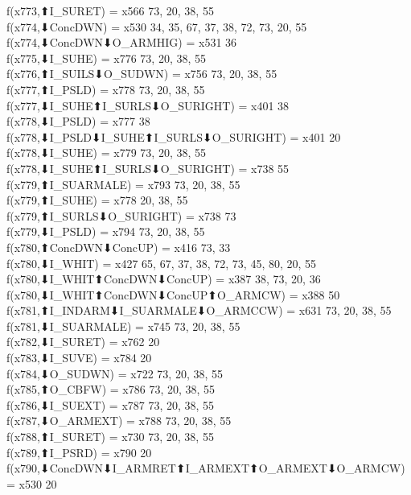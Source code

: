 f(x773,⬆I_SURET) = x566 {73, 20, 38, 55} \\
f(x774,⬇ConcDWN) = x530 {34, 35, 67, 37, 38, 72, 73, 20, 55} \\
f(x774,⬇ConcDWN⬇O_ARMHIG) = x531 {36} \\
f(x775,⬇I_SUHE) = x776 {73, 20, 38, 55} \\
f(x776,⬆I_SUILS⬇O_SUDWN) = x756 {73, 20, 38, 55} \\
f(x777,⬆I_PSLD) = x778 {73, 20, 38, 55} \\
f(x777,⬇I_SUHE⬆I_SURLS⬇O_SURIGHT) = x401 {38} \\
f(x778,⬇I_PSLD) = x777 {38} \\
f(x778,⬇I_PSLD⬇I_SUHE⬆I_SURLS⬇O_SURIGHT) = x401 {20} \\
f(x778,⬇I_SUHE) = x779 {73, 20, 38, 55} \\
f(x778,⬇I_SUHE⬆I_SURLS⬇O_SURIGHT) = x738 {55} \\
f(x779,⬆I_SUARMALE) = x793 {73, 20, 38, 55} \\
f(x779,⬆I_SUHE) = x778 {20, 38, 55} \\
f(x779,⬆I_SURLS⬇O_SURIGHT) = x738 {73} \\
f(x779,⬇I_PSLD) = x794 {73, 20, 38, 55} \\
f(x780,⬆ConcDWN⬇ConcUP) = x416 {73, 33} \\
f(x780,⬇I_WHIT) = x427 {65, 67, 37, 38, 72, 73, 45, 80, 20, 55} \\
f(x780,⬇I_WHIT⬆ConcDWN⬇ConcUP) = x387 {38, 73, 20, 36} \\
f(x780,⬇I_WHIT⬆ConcDWN⬇ConcUP⬆O_ARMCW) = x388 {50} \\
f(x781,⬆I_INDARM⬇I_SUARMALE⬇O_ARMCCW) = x631 {73, 20, 38, 55} \\
f(x781,⬇I_SUARMALE) = x745 {73, 20, 38, 55} \\
f(x782,⬇I_SURET) = x762 {20} \\
f(x783,⬇I_SUVE) = x784 {20} \\
f(x784,⬇O_SUDWN) = x722 {73, 20, 38, 55} \\
f(x785,⬆O_CBFW) = x786 {73, 20, 38, 55} \\
f(x786,⬇I_SUEXT) = x787 {73, 20, 38, 55} \\
f(x787,⬇O_ARMEXT) = x788 {73, 20, 38, 55} \\
f(x788,⬆I_SURET) = x730 {73, 20, 38, 55} \\
f(x789,⬆I_PSRD) = x790 {20} \\
f(x790,⬇ConcDWN⬇I_ARMRET⬆I_ARMEXT⬆O_ARMEXT⬇O_ARMCW) = x530 {20} \\
